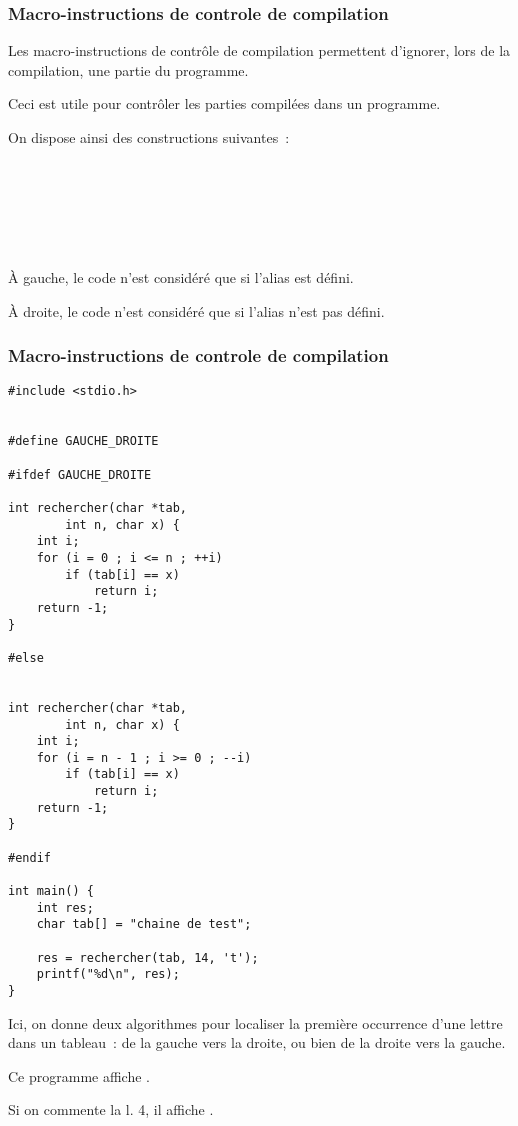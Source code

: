 \begin{frame} \frametitle{Macro-instructions de controle de compilation}
Les \alert{macro-instructions de contrôle de compilation} permettent 
d'ignorer, lors de la compilation, une partie du programme.
\medskip

Ceci est utile pour contrôler les parties compilées dans un programme.
\bigskip

On dispose ainsi des constructions suivantes~:
\begin{multicols}{2}
 \\
\Code{\dots} \\

 \\
\Code{\dots} \\
\end{multicols}

À gauche, le code \Code{\dots} n'est considéré que si l'alias 
est défini.
\medskip

À droite, le code \Code{\dots} n'est considéré que si l'alias 
n'est pas défini.
\end{frame}

\begin{frame}[fragile] 
\frametitle{Macro-instructions de controle de compilation}
\begin{multicols}{2}
\begin{lstlisting}[basicstyle=\ttfamily\scriptsize]
#include <stdio.h>


#define GAUCHE_DROITE

#ifdef GAUCHE_DROITE

int rechercher(char *tab, 
        int n, char x) {
    int i;
    for (i = 0 ; i <= n ; ++i)
        if (tab[i] == x)
            return i;
    return -1;
}

#else


int rechercher(char *tab, 
        int n, char x) {
    int i;
    for (i = n - 1 ; i >= 0 ; --i)
        if (tab[i] == x)
            return i;
    return -1;
}

#endif

int main() {
    int res;
    char tab[] = "chaine de test";
    
    res = rechercher(tab, 14, 't');
    printf("%d\n", res);
}
\end{lstlisting}
\end{multicols}

\begin{footnotesize}
Ici, on donne deux algorithmes pour localiser la première occurrence
d'une lettre dans un tableau~: de la gauche vers la droite, ou bien
de la droite vers la gauche.
\smallskip

Ce programme affiche .
\smallskip

Si on commente la l. 4, il affiche .
\end{footnotesize}
\end{frame}
